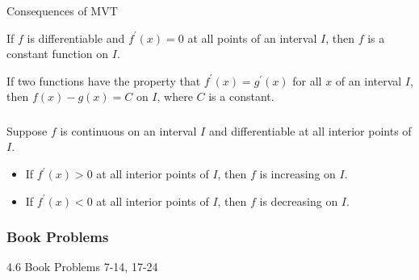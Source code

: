 \documentclass[cal1spr16Lectures.tex]{subfiles}
\begin{document}
\begin{frame}{\small Consequences of MVT}
\small
\begin{thm}
If $f$ is differentiable and $f^{\prime}(x)=0$ at all points of an interval $I$, then $f$ is a constant function on $I$.
\end{thm}

\vspace{1pc}
\begin{thm}
If two functions have the property that $f^{\prime}(x)=g^{\prime}(x)$ for all $x$ of an interval $I$, then $f(x)-g(x)=C$ on $I$, where $C$ is a constant.
\end{thm}
\end{frame}

\begin{frame}
\frametitle{}
\small
\begin{thm}
Suppose $f$ is continuous on an interval $I$ and differentiable at all interior points of $I$.
\begin{itemize}
\item If $f^{\prime}(x)>0$ at all interior points of $I$, then $f$ is increasing on $I$.
\item If $f^{\prime}(x)<0$ at all interior points of $I$, then $f$ is decreasing on $I$.
\end{itemize}
\end{thm}
\end{frame}

\subsubsection{Book Problems}

\begin{frame}
\begin{block}{4.6 Book Problems}
7-14, 17-24
\end{block}
\end{frame}
\end{document}
